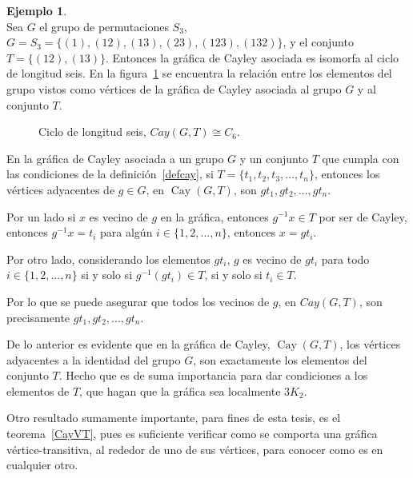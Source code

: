 \documentclass[11pt]{book}
\theoremstyle{definition}
\newtheorem{example}{Ejemplo}
\DeclareMathOperator{\Cay}{Cay}
\begin{document}
\begin{example}\textbf{}\\
  Sea $G$ el grupo de permutaciones $S_3$, $G=S_3=
  \{(1),(12),(13),(23),(123),(132)\}$, y el conjunto $T=\{(12),(13)\}$.
 Entonces la gráfica de Cayley asociada es isomorfa al ciclo de
 longitud seis. En la figura~\ref{C6} se encuentra la relación entre
 los elementos del grupo vistos como vértices de la gráfica de Cayley
 asociada al grupo $G$ y al conjunto $T$.
\end{example}


\begin{figure}[htb]
  \centering
  \caption{Ciclo de longitud seis, $Cay(G,T)\cong C_6$.} \label{C6}
\end{figure}


En la gráfica de Cayley asociada a un grupo $G$ y un conjunto $T$ que
cumpla con las condiciones de la definición~\ref{defcay}, si $T=\{t_1,t_2,t_3,..., t_n\}$, entonces los vértices adyacentes de $g\in G$, en
$\Cay(G,T)$, son $gt_1,gt_2,...,gt_n$. 

Por un lado si $x$ es vecino de $g$ en la gráfica, entonces $g^{-1}x\in T$ por ser de Cayley, entonces  $g^{-1}x=t_i$
para algún $i\in \{1,2,...,n\}$, entonces $x=gt_i$.

Por otro lado, considerando los elementos $gt_i$, $g$ es vecino
de $gt_i$ para todo $i\in \{1,2,...,n\}$ si y solo si $g^{-1}(gt_i)\in
T$, si y solo si $t_i \in T$.

Por lo que se puede asegurar que todos
los vecinos de $g$, en $Cay(G,T)$, son  precisamente $gt_1,gt_2,...,gt_n$. 

De lo anterior es evidente que en la gráfica de Cayley, $\Cay(G,T)$,
los vértices adyacentes a la identidad del grupo $G$, son exactamente
los elementos del conjunto $T$. Hecho que es de suma
importancia para dar condiciones a los elementos de $T$, que hagan que
la gráfica sea localmente $3K_2$.


Otro resultado sumamente importante, para fines de esta tesis, es el
teorema~\ref{CayVT}, pues es suficiente verificar como se comporta una gráfica
vértice-transitiva, al rededor de uno de sus vértices, para conocer como es en cualquier otro.
\end{document}
